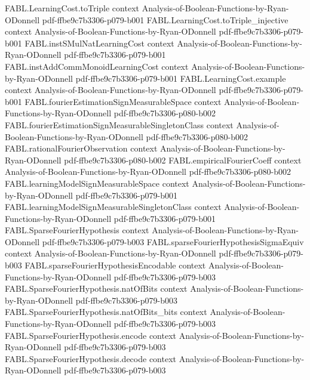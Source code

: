 \begin{theorem}
\proofstep
  {FABL.LearningCost.toTriple}
  {context}
  {Analysis-of-Boolean-Functions-by-Ryan-ODonnell}
  {pdf-ffbe9c7b3306-p079-b001}
\proofstep
  {FABL.LearningCost.toTriple_injective}
  {context}
  {Analysis-of-Boolean-Functions-by-Ryan-ODonnell}
  {pdf-ffbe9c7b3306-p079-b001}
\proofstep
  {FABL.instSMulNatLearningCost}
  {context}
  {Analysis-of-Boolean-Functions-by-Ryan-ODonnell}
  {pdf-ffbe9c7b3306-p079-b001}
\proofstep
  {FABL.instAddCommMonoidLearningCost}
  {context}
  {Analysis-of-Boolean-Functions-by-Ryan-ODonnell}
  {pdf-ffbe9c7b3306-p079-b001}
\proofstep
  {FABL.LearningCost.example}
  {context}
  {Analysis-of-Boolean-Functions-by-Ryan-ODonnell}
  {pdf-ffbe9c7b3306-p079-b001}
\proofstep
  {FABL.fourierEstimationSignMeasurableSpace}
  {context}
  {Analysis-of-Boolean-Functions-by-Ryan-ODonnell}
  {pdf-ffbe9c7b3306-p080-b002}
\proofstep
  {FABL.fourierEstimationSignMeasurableSingletonClass}
  {context}
  {Analysis-of-Boolean-Functions-by-Ryan-ODonnell}
  {pdf-ffbe9c7b3306-p080-b002}
\proofstep
  {FABL.rationalFourierObservation}
  {context}
  {Analysis-of-Boolean-Functions-by-Ryan-ODonnell}
  {pdf-ffbe9c7b3306-p080-b002}
\proofstep
  {FABL.empiricalFourierCoeff}
  {context}
  {Analysis-of-Boolean-Functions-by-Ryan-ODonnell}
  {pdf-ffbe9c7b3306-p080-b002}
\proofstep
  {FABL.learningModelSignMeasurableSpace}
  {context}
  {Analysis-of-Boolean-Functions-by-Ryan-ODonnell}
  {pdf-ffbe9c7b3306-p079-b001}
\proofstep
  {FABL.learningModelSignMeasurableSingletonClass}
  {context}
  {Analysis-of-Boolean-Functions-by-Ryan-ODonnell}
  {pdf-ffbe9c7b3306-p079-b001}
\proofstep
  {FABL.SparseFourierHypothesis}
  {context}
  {Analysis-of-Boolean-Functions-by-Ryan-ODonnell}
  {pdf-ffbe9c7b3306-p079-b003}
\proofstep
  {FABL.sparseFourierHypothesisSigmaEquiv}
  {context}
  {Analysis-of-Boolean-Functions-by-Ryan-ODonnell}
  {pdf-ffbe9c7b3306-p079-b003}
\proofstep
  {FABL.sparseFourierHypothesisEncodable}
  {context}
  {Analysis-of-Boolean-Functions-by-Ryan-ODonnell}
  {pdf-ffbe9c7b3306-p079-b003}
\proofstep
  {FABL.SparseFourierHypothesis.natOfBits}
  {context}
  {Analysis-of-Boolean-Functions-by-Ryan-ODonnell}
  {pdf-ffbe9c7b3306-p079-b003}
\proofstep
  {FABL.SparseFourierHypothesis.natOfBits_bits}
  {context}
  {Analysis-of-Boolean-Functions-by-Ryan-ODonnell}
  {pdf-ffbe9c7b3306-p079-b003}
\proofstep
  {FABL.SparseFourierHypothesis.encode}
  {context}
  {Analysis-of-Boolean-Functions-by-Ryan-ODonnell}
  {pdf-ffbe9c7b3306-p079-b003}
\proofstep
  {FABL.SparseFourierHypothesis.decode}
  {context}
  {Analysis-of-Boolean-Functions-by-Ryan-ODonnell}
  {pdf-ffbe9c7b3306-p079-b003}

\end{theorem}
